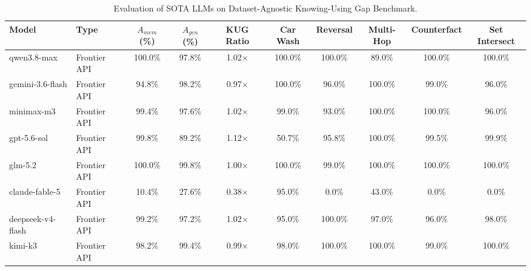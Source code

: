 \begin{table}[t]
\centering
\small
\begin{tabular}{l l c c c c c c c c}
\toprule
\textbf{Model} & \textbf{Type} & \textbf{$A_{mem}$ (\%)} & \textbf{$A_{gen}$ (\%)} & \textbf{KUG Ratio} & \textbf{Car Wash} & \textbf{Reversal} & \textbf{Multi-Hop} & \textbf{Counterfact} & \textbf{Set Intersect} \\
\midrule
qwen3.8-max & Frontier API & 100.0\% & 97.8\% & 1.02$\times$ & 100.0\% & 100.0\% & 89.0\% & 100.0\% & 100.0\% \\
gemini-3.6-flash & Frontier API & 94.8\% & 98.2\% & 0.97$\times$ & 100.0\% & 96.0\% & 100.0\% & 99.0\% & 96.0\% \\
minimax-m3 & Frontier API & 99.4\% & 97.6\% & 1.02$\times$ & 99.0\% & 93.0\% & 100.0\% & 100.0\% & 96.0\% \\
gpt-5.6-sol & Frontier API & 99.8\% & 89.2\% & 1.12$\times$ & 50.7\% & 95.8\% & 100.0\% & 99.5\% & 99.9\% \\
glm-5.2 & Frontier API & 100.0\% & 99.8\% & 1.00$\times$ & 100.0\% & 99.0\% & 100.0\% & 100.0\% & 100.0\% \\
claude-fable-5 & Frontier API & 10.4\% & 27.6\% & 0.38$\times$ & 95.0\% & 0.0\% & 43.0\% & 0.0\% & 0.0\% \\
deepseek-v4-flash & Frontier API & 99.2\% & 97.2\% & 1.02$\times$ & 95.0\% & 100.0\% & 97.0\% & 96.0\% & 98.0\% \\
kimi-k3 & Frontier API & 98.2\% & 99.4\% & 0.99$\times$ & 98.0\% & 100.0\% & 100.0\% & 99.0\% & 100.0\% \\
\bottomrule
\end{tabular}
\caption{Evaluation of SOTA LLMs on Dataset-Agnostic Knowing-Using Gap Benchmark.}
\label{tab:kug_eval_summary}
\end{table}
